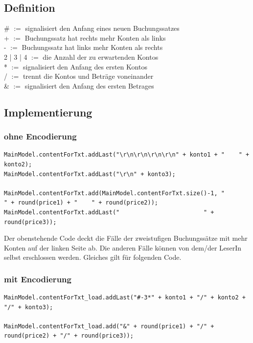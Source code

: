 \documentclass[12pt]{report}
\begin{document}
\subsection{Definition}
\# $:=$ signalisiert den Anfang eines neuen Buchungssatzes\\
+ $:=$ Buchungssatz hat rechts mehr Konten als links\\
- $:=$ Buchungssatz hat links mehr Konten als rechts\\
2 | 3 | 4 $:=$ die Anzahl der zu erwartenden Kontos\\
* $:=$ signalisiert den Anfang des ersten Kontos\\
/ $:=$ trennt die Kontos und Beträge voneinander\\
\& $:=$ signalisiert den Anfang des ersten Betrages\\

\subsection{Implementierung}

\subsubsection{ohne Encodierung}
\begin{lstlisting}
MainModel.contentForTxt.addLast("\r\n\r\n\r\n\r\n" + konto1 + "    " + konto2);
MainModel.contentForTxt.addLast("\r\n" + konto3);

MainModel.contentForTxt.add(MainModel.contentForTxt.size()-1, "                " + round(price1) + "    " + round(price2));
MainModel.contentForTxt.addLast("                        " + round(price3));
\end{lstlisting}

\noindent Der obenstehende Code deckt die Fälle der zweistufigen Buchungssätze mit mehr Konten auf der linken Seite ab. Die anderen Fälle können von dem/der LeserIn selbst erschlossen werden. Gleiches gilt für folgenden Code.\\

\subsubsection{mit Encodierung}
\begin{lstlisting}
MainModel.contentForTxt_load.addLast("#-3*" + konto1 + "/" + konto2 + "/" + konto3);

MainModel.contentForTxt_load.add("&" + round(price1) + "/" + round(price2) + "/" + round(price3));
\end{lstlisting}
\end{document}
